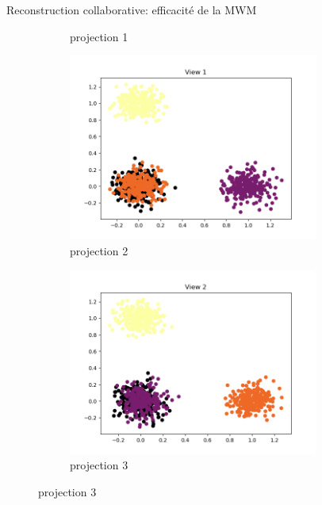 \documentclass[hyperref={pdfpagelabels=false}]{beamer}
\begin{document}
\begin{frame}{Reconstruction collaborative: efficacité de la MWM}
\begin{figure}[h]
\begin{subfigure}[h]{0.24\textwidth}
                \caption{projection 1}
            \end{subfigure}
            \begin{subfigure}[h]{0.24\textwidth}
                \centering
                \includegraphics[width=0.9\textwidth]{projection1}
                \caption{projection 2}
            \end{subfigure}
            \begin{subfigure}[h]{0.24\textwidth}
                \centering
                \includegraphics[width=0.9\textwidth]{projection2}
                \caption{projection 3}
            \end{subfigure}
        \end{figure}
    \end{frame}
\end{document}
